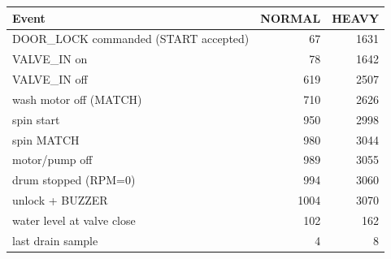 \begin{tabular}{lrr}\toprule Event & NORMAL & HEAVY \\ \midrule
DOOR\_LOCK commanded (START accepted) & 67 & 1631 \\
VALVE\_IN on & 78 & 1642 \\
VALVE\_IN off & 619 & 2507 \\
wash motor off (MATCH) & 710 & 2626 \\
spin start & 950 & 2998 \\
spin MATCH & 980 & 3044 \\
motor/pump off & 989 & 3055 \\
drum stopped (RPM=0) & 994 & 3060 \\
unlock + BUZZER & 1004 & 3070 \\
water level at valve close & 102 & 162 \\
last drain sample & 4 & 8 \\
\bottomrule\end{tabular}
